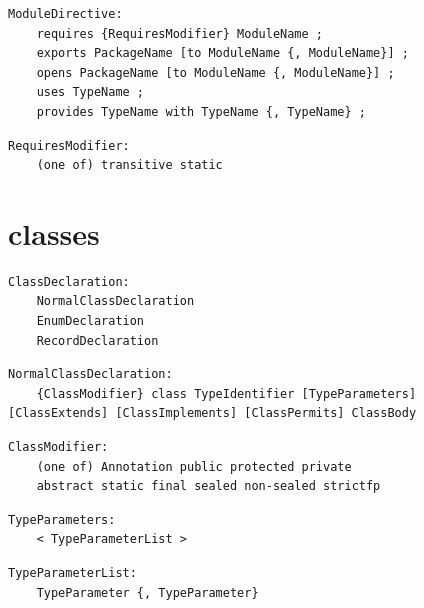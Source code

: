 \noindent\textbf{\texttt{}}\par
\begin{lstlisting}
ModuleDirective:
    requires {RequiresModifier} ModuleName ;
    exports PackageName [to ModuleName {, ModuleName}] ;
    opens PackageName [to ModuleName {, ModuleName}] ;
    uses TypeName ;
    provides TypeName with TypeName {, TypeName} ;
\end{lstlisting}

\noindent\textbf{\texttt{}}\par
\begin{lstlisting}
RequiresModifier:
    (one of) transitive static
\end{lstlisting}

\section{classes}

\noindent\textbf{\texttt{}}\par
\begin{lstlisting}
ClassDeclaration:
    NormalClassDeclaration
    EnumDeclaration
    RecordDeclaration
\end{lstlisting}

\noindent\textbf{\texttt{}}\par
\begin{lstlisting}
NormalClassDeclaration:
    {ClassModifier} class TypeIdentifier [TypeParameters] [ClassExtends] [ClassImplements] [ClassPermits] ClassBody
\end{lstlisting}

\noindent\textbf{\texttt{}}\par
\begin{lstlisting}
ClassModifier:
    (one of) Annotation public protected private
    abstract static final sealed non-sealed strictfp
\end{lstlisting}

\noindent\textbf{\texttt{}}\par
\begin{lstlisting}
TypeParameters:
    < TypeParameterList >
\end{lstlisting}

\noindent\textbf{\texttt{}}\par
\begin{lstlisting}
TypeParameterList:
    TypeParameter {, TypeParameter}
\end{lstlisting}

